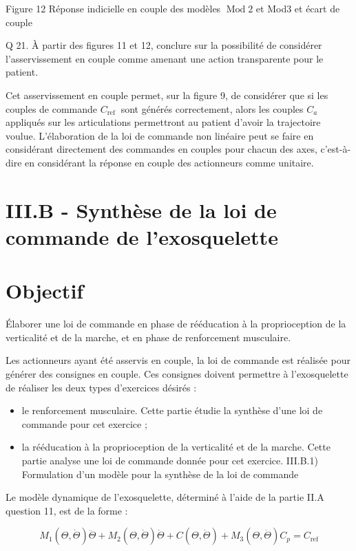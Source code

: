 \documentclass[10pt]{article}
\begin{document}
Figure 12 Réponse indicielle en couple des modèles $\operatorname{Mod} 2$ et Mod3 et écart de couple

Q 21. À partir des figures 11 et 12, conclure sur la possibilité de considérer l'asservissement en couple comme amenant une action transparente pour le patient.

Cet asservissement en couple permet, sur la figure 9, de considérer que si les couples de commande $C_{\text {ref }}$ sont générés correctement, alors les couples $C_{a}$ appliqués sur les articulations permettront au patient d'avoir la trajectoire voulue. L'élaboration de la loi de commande non linéaire peut se faire en considérant directement des commandes en couples pour chacun des axes, c'est-à-dire en considérant la réponse en couple des actionneurs comme unitaire.

\section{III.B - Synthèse de la loi de commande de l'exosquelette}
\section{Objectif}
Élaborer une loi de commande en phase de rééducation à la proprioception de la verticalité et de la marche, et en phase de renforcement musculaire.

Les actionneurs ayant été asservis en couple, la loi de commande est réalisée pour générer des consignes en couple. Ces consignes doivent permettre à l'exosquelette de réaliser les deux types d'exercices désirés :

\begin{itemize}
  \item le renforcement musculaire. Cette partie étudie la synthèse d'une loi de commande pour cet exercice ;

  \item la rééducation à la proprioception de la verticalité et de la marche. Cette partie analyse une loi de commande donnée pour cet exercice. III.B.1) Formulation d'un modèle pour la synthèse de la loi de commande

\end{itemize}

Le modèle dynamique de l'exosquelette, déterminé à l'aide de la partie II.A question 11, est de la forme :

$$
M_{1}(\Theta, \dot{\Theta}) \ddot{\Theta}+M_{2}(\Theta, \dot{\Theta}) \dot{\Theta}+C(\Theta, \dot{\Theta})+M_{3}(\Theta, \dot{\Theta}) C_{p}=C_{\mathrm{ref}}
$$
\end{document}
